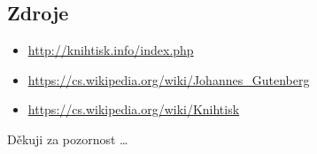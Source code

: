 \documentclass[brown]{beamer}
\begin{document}
\subsection{Zdroje}

\begin{frame}
  \begin{itemize}
  \frametitle{Zdroje}
  \item \url{http://knihtisk.info/index.php}
  \item \url{https://cs.wikipedia.org/wiki/Johannes_Gutenberg}
  \item \url{https://cs.wikipedia.org/wiki/Knihtisk}
  \end{itemize}
\end{frame}


\begin{frame}
  \begin{center}
		\huge{\quad Děkuji za pozornost \ldots}
  \end{center}
\end{frame}
\end{document}
